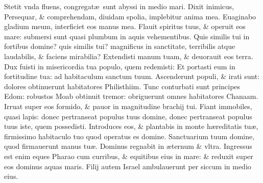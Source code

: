 \documentclass[a5paper,10pt]{book}
\def\ae{æ}
\begin{document}
\begin{multicols*}{2}
\newline \color{red} S\color{black}tetit vnda fluens, congregat\ae \ sunt abyssi in medio mari.
\newline \color{red} D\color{black}ixit inimicus, Persequar, \& comprehendam, diuidam spolia, implebitur anima mea.
\newline \color{red} E\color{black}uaginabo gladium meum, interficiet eos manus mea.
\newline \color{red} F\color{black}lauit spiritus tuus, \& operuit eos mare: submersi sunt quasi plumbum in aquis vehementibus.
\newline \color{red} Q\color{black}uis similis tui in fortibus domine? quis similis tui? magnificus in sanctitate, terribilis atque laudabilis, \& faciens mirabilia?
\newline \color{red} E\color{black}xtendisti manum tuam, \& deuorauit eos terra.
\newline \color{red} D\color{black}ux fuisti in misericordia tua populo, quem redemisti:
\newline \color{red} E\color{black}t portasti eum in fortitudine tua: ad habitaculum sanctum tuum.
\newline \color{red} A\color{black}scenderunt populi, \& irati sunt: dolores obtinuerunt habitatores Philisthiim.
\newline \color{red} T\color{black}unc conturbati sunt principes Edom: robustos Moab obtinuit tremor: obriguerunt omnes habitatores Chanaam.
\newline \color{red} I\color{black}rruat super eos formido, \& pauor in magnitudine brachij tui.
\newline \color{red} F\color{black}iant immobiles, quasi lapis: donec pertranseat populus tuus domine, donec pertranseat populus tuus iste, quem possedisti.
\newline \color{red} I\color{black}ntroduces eos, \& plantabis in monte h\ae reditatis tu\ae , firmissimo habitaculo tuo quod operatus es domine.
\newline \color{red} S\color{black}anctuarium tuum domine, quod firmauerunt manus tu\ae .
\newline \color{red} D\color{black}ominus regnabit in \ae ternum \& vltra.
\newline \color{red} I\color{black}ngressus est enim eques Pharao cum curribus, \& equitibus eius in mare: \& reduxit super eos dominus aquas maris.
\newline \color{red} F\color{black}ilij autem Israel ambulauerunt per siccum in medio eius.

\end{multicols*}
\end{document}
